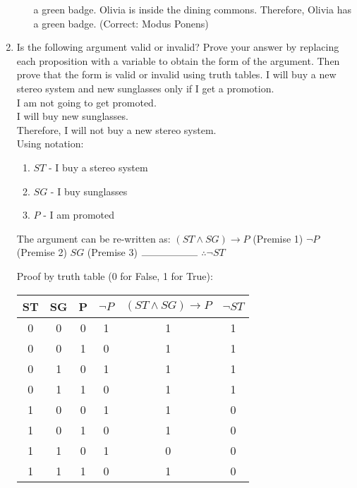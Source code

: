 \documentclass[12pt, oneside]{article}
\begin{document}
\begin{enumerate}
\begin{enumerate}
a green badge. Olivia is inside the dining commons. Therefore,
Olivia has a green badge.
(Correct: Modus Ponens)
\end{enumerate}
\item Is the following argument valid or invalid? Prove your
answer by replacing each proposition with a variable to obtain
the form of the argument. Then prove that the form is valid or
invalid using truth tables.
I will buy a new stereo system and new sunglasses only if I get a
promotion.\\
I am not going to get promoted.\\
I will buy new sunglasses.\\
Therefore, I will not buy a new stereo system. \\
\newline Using notation:
\begin{enumerate}
    \item $ST$ - I buy a stereo system
    \item $SG$ - I buy sunglasses
    \item $P$ - I am promoted
\end{enumerate}
\vspace{-1em}
\newpage
The argument can be re-written as:
\newline $(ST \land SG) \rightarrow P$ (Premise 1)
\newline $\neg P$ (Premise 2) 
\newline $SG$ (Premise 3)
\newline $\rule{2cm}{0.1mm}$
\newline $\therefore \neg ST$

Proof by truth table (0 for False, 1 for True):
\begin{table}[htbp]
    \centering
    \begin{tabular}{|c|c|c|c|c|c|}
    \hline 
        \textbf{ST} & \textbf{SG} & \textbf{P} & $\neg P$ & $(ST \land SG) \to P$ & $\neg ST$ \\
    \hline
        0 & 0 & 0 & 1 & 1 & 1\\
    \hline
        0 & 0 & 1 & 0 & 1 & 1\\
    \hline
        0 & 1 & 0 & 1 & 1 & 1\\ 
    \hline
        0 & 1 & 1 & 0 & 1 & 1\\ 
    \hline
        1 & 0 & 0 & 1 & 1 & 0\\ 
    \hline
        1 & 0 & 1 & 0 & 1 & 0\\
    \hline
        1 & 1 & 0 & 1 & 0 & 0\\ 
    \hline
        1 & 1 & 1 & 0 & 1 & 0\\ 
    \hline
    \end{tabular}
\end{table}


\end{enumerate}
\end{document}

